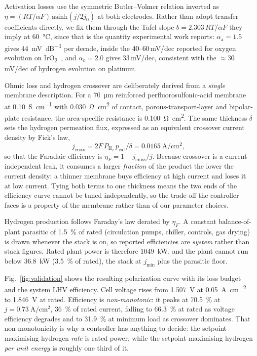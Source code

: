 \documentclass[conference]{IEEEtran}
\begin{document}
Activation losses use the symmetric Butler--Volmer relation inverted as
$\eta=(RT/\alpha F)\,\mathrm{asinh}(j/2j_0)$ at both electrodes. Rather than adopt transfer
coefficients directly, we fix them through the Tafel slope $b=2.303\,RT/\alpha F$ they imply
at \SI{60}{\celsius}, since that is the quantity experimental work reports:
$\alpha_\mathrm{a}=1.5$ gives \SI{44}{\milli\volt\per\deci\bel} per decade, inside the
40--60\,mV/dec reported for oxygen evolution on
IrO\textsubscript{2}~\cite{feng2017pemwe,yu2020iridium}, and $\alpha_\mathrm{c}=2.0$ gives
33\,mV/dec, consistent with the $\approx$30\,mV/dec of hydrogen evolution on platinum.

Ohmic loss and hydrogen crossover are deliberately derived from a \emph{single} membrane
description. For a \SI{70}{\micro\meter} reinforced perfluorosulfonic-acid membrane at
\SI{0.10}{\siemens\per\centi\meter} with \SI{0.030}{\ohm\centi\meter\squared} of contact,
porous-transport-layer and bipolar-plate resistance, the area-specific resistance is
\SI{0.100}{\ohm\centi\meter\squared}. The same thickness $\delta$ sets the hydrogen
permeation flux, expressed as an equivalent crossover current density by Fick's law,
\begin{equation}
j_\mathrm{cross} = 2F\,P_{\mathrm{H_2}}\,p_\mathrm{cat} / \delta
                 = \SI{0.0165}{\ampere\per\centi\meter\squared},
\label{eq:crossover}
\end{equation}
so that the Faradaic efficiency is $\eta_F = 1 - j_\mathrm{cross}/j$. Because crossover is
a current-independent leak, it consumes a larger \emph{fraction} of the product the lower
the current density: a thinner membrane buys efficiency at high current and loses it at low
current. Tying both terms to one thickness means the two ends of the efficiency curve
cannot be tuned independently, so the trade-off the controller faces is a property of the
membrane rather than of our parameter choices.

Hydrogen production follows Faraday's law derated by $\eta_F$. A constant balance-of-plant
parasitic of \SI{1.5}{\percent} of rated (circulation pumps, chiller, controls, gas drying)
is drawn whenever the stack is on, so reported efficiencies are \emph{system} rather than
stack figures. Rated plant power is therefore \SI{1049}{\kilo\watt}, and the plant cannot
run below \SI{36.8}{\kilo\watt} (\SI{3.5}{\percent} of rated), the stack at $j_\mathrm{min}$
plus the parasitic floor.

Fig.~\ref{fig:validation} shows the resulting polarization curve with its loss budget and
the system LHV efficiency. Cell voltage rises from \SI{1.507}{\volt} at
\SI{0.05}{\ampere\per\centi\meter\squared} to \SI{1.846}{\volt} at rated. Efficiency is
\emph{non-monotonic}: it peaks at \SI{70.5}{\percent} at
$j=\SI{0.73}{\ampere\per\centi\meter\squared}$, \SI{36}{\percent} of rated current, falling
to \SI{66.3}{\percent} at rated as voltage efficiency degrades and to \SI{31.9}{\percent} at
minimum load as crossover dominates. That non-monotonicity is why a controller has anything
to decide: the setpoint maximising hydrogen \emph{rate} is rated power, while the setpoint
maximising hydrogen \emph{per unit energy} is roughly one third of it.
\end{document}

